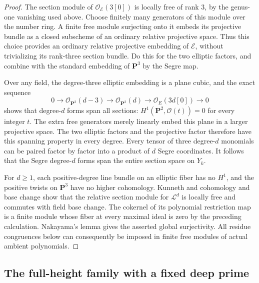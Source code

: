 \begin{proof}
The section module of \(\mathcal O_{\mathcal E}(3[0])\)
is locally free of rank \(3\), by the genus-one
vanishing used above.  Choose finitely many generators
of this module over the number ring.  A finite free
module surjecting onto it embeds its projective bundle
as a closed subscheme of an ordinary relative
projective space.  Thus this choice provides an
ordinary relative projective embedding of
\(\mathcal E\), without trivializing its rank-three
section bundle.  Do this for the two elliptic
factors, and combine with the standard embedding
of \(\mathbf P^3\) by the Segre map.

Over any field, the degree-three elliptic embedding
is a plane cubic, and the exact sequence
\[
 0\longrightarrow\mathcal O_{\mathbf P^2}(d-3)
  \longrightarrow\mathcal O_{\mathbf P^2}(d)
  \longrightarrow\mathcal O_E(3d[0])
  \longrightarrow0
\]
shows that degree-\(d\) forms span all sections:
\(H^1(\mathbf P^2,\mathcal O(t))=0\) for every integer
\(t\).  The extra free generators merely linearly
embed this plane in a larger projective space.
The two elliptic factors and the projective factor
therefore have this spanning property in every degree.
Every tensor of three degree-\(d\) monomials can be
paired factor by factor into a product of \(d\)
Segre coordinates.  It follows that the Segre
degree-\(d\) forms span the entire section space
on \(Y_k\).

For \(d\ge1\), each positive-degree line bundle on
an elliptic fiber has no \(H^1\), and the positive
twists on \(\mathbf P^3\) have no higher cohomology.
Kunneth and cohomology and base change show that
the relative section module for \(\mathcal L^d\)
is locally free and commutes with field base change.
The cokernel of its polynomial restriction map
is a finite module whose fiber at every maximal
ideal is zero by the preceding calculation.
Nakayama's lemma gives the asserted global
surjectivity.  All residue congruences below
can consequently be imposed in finite free
modules of actual ambient polynomials.
\end{proof}

\subsection{The full-height family with a fixed deep prime}

